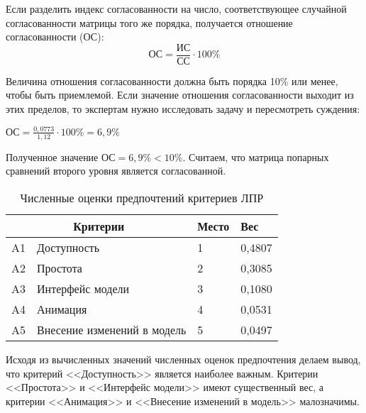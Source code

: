 Если разделить индекс согласованности на число, соответствующее случайной согласованности матрицы того же порядка, получается отношение согласованности (ОС):
\begin{equation}
\text{ОС} = \frac{\text{ИС}}{\text{СС}} \cdot 100\%
\end{equation}

Величина отношения согласованности должна быть порядка 10\% или менее, чтобы быть приемлемой.
Если значение отношения согласованности выходит из этих пределов, то экспертам нужно исследовать задачу и пересмотреть суждения:

$\text{ОС} = \frac{0,0773}{1,12} \cdot 100\% = 6,9\%$

Полученное значение $\text{ОС} = 6,9\% < 10\%$.
Считаем, что матрица попарных сравнений второго уровня является согласованной.
\begin{table}[H]
  \caption{Численные оценки предпочтений критериев ЛПР}\label{marks}
  \begin{tabular}{|p{0.6cm}|p{8cm}|l|l|}
  \hline \multicolumn{2}{|c|}{Критерии} & Место & Вес \\
  \hline A1 & Доступность & 1 & 0,4807 \\
  \hline A2 & Простота & 2 & 0,3085 \\
  \hline A3 & Интерфейс модели & 3 & 0,1080 \\
  \hline A4 & Анимация & 4 & 0,0531 \\
  \hline A5 & Внесение изменений в модель & 5 & 0,0497 \\
  \hline
  \end{tabular}
\end{table}

Исходя из вычисленных значений численных оценок предпочтения делаем вывод, что критерий <<Доступность>> является наиболее важным.
Критерии <<Простота>> и <<Интерфейс модели>> имеют существенный вес, а критерии <<Анимация>> и <<Внесение изменений в модель>> малозначимы.

\clearpage
